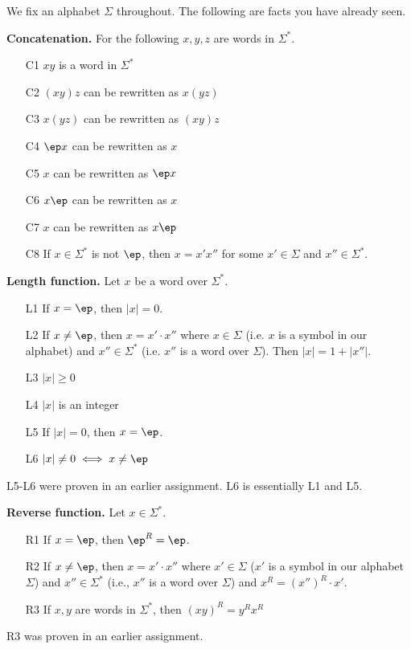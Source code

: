 



\renewcommand\TITLE{Test 1 Part B}
\renewcommand\AUTHOR{John Doe}
\renewcommand\EMAIL{jdoe@jdoe.com}


\topmatter


We fix an alphabet $\Sigma$ throughout.
The following are facts you have already seen.

{\bf Concatenation.}
For the following $x,y,z$ are words in $\Sigma^*$.
\begin{enumerate}
\item[C1] $xy$ is a word in $\Sigma^*$
\item[C2] $(xy)z$ can be rewritten as $x(yz)$
\item[C3] $x(yz)$ can be rewritten as $(xy)z$
\item[C4] $\ep x$ can be rewritten as $x$
\item[C5] $x$ can be rewritten as $\ep x$
\item[C6] $x\ep$ can be rewritten as $x$
\item[C7] $x$ can be rewritten as $x\ep$
\item[C8] If $x \in \Sigma^*$ is not $\ep$, then 
$x = x'x''$ for some $x' \in \Sigma$ and $x'' \in \Sigma^*$.
\end{enumerate}

{\bf Length function.}
Let $x$ be a word over $\Sigma^*$.
\begin{enumerate}
\item[L1] If $x = \ep$, then $|x| = 0$.
\item[L2] If $x \neq \ep$, then $x = x' \cdot x''$ where
$x \in \Sigma$ (i.e. $x$ is a symbol in our alphabet)
and $x'' \in \Sigma^*$ (i.e. $x''$ is a word over $\Sigma$).
Then $|x| = 1 + |x''|$.
\item[L3] $|x| \geq 0$
\item[L4] $|x|$ is an integer 
\item[L5] If $|x| = 0$, then $x = \ep$.
\item[L6] $|x| \neq 0 \iff x \neq \ep$
\end{enumerate}
L5-L6 were proven in an earlier assignment.
L6 is essentially L1 and L5.


{\bf Reverse function.} 
Let $x \in \Sigma^*$.
\begin{enumerate}
\item[R1] If $x = \ep$, then $\ep^R = \ep$.
\item[R2] If $x \neq \ep$, then $x = x'\cdot x''$ where
$x' \in \Sigma$ ($x'$ is a symbol in our alphabet $\Sigma$) 
and $x'' \in \Sigma^*$ (i.e., $x''$ is a word over $\Sigma$) 
and $x^R = (x'')^R \cdot x'$.
\item[R3] If $x,y$ are words in $\Sigma^*$, then
$(xy)^R = y^R x^R$
\end{enumerate}
R3 was proven in an earlier assignment.

